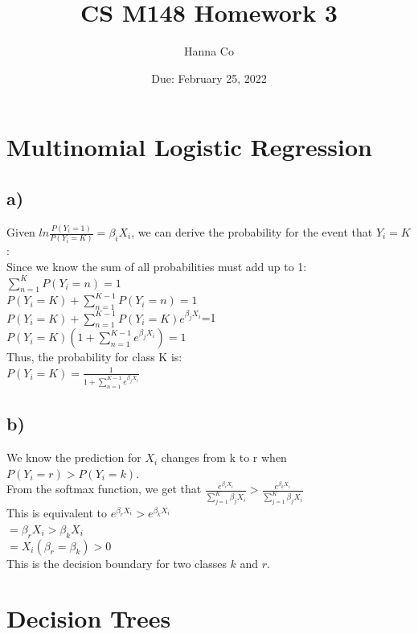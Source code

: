 \documentclass[12pt, letterpaper]{article}
\title{CS M148 Homework 3}
\author{Hanna Co}
\date{Due: February 25, 2022}
\begin{document}
\maketitle
\newpage
\section{Multinomial Logistic Regression}
\subsection*{a)} Given $ln\frac{P(Y_i=1)}{P(Y_i=K)} = \beta_iX_i$, we can derive the probability for the event that $Y_i=K$:\\
Since we know the sum of all probabilities must add up to 1:\\
$\sum_{n=1}^{K}P(Y_i=n)=1$\\
$P(Y_i=K)+\sum_{n=1}^{K-1}P(Y_i=n)=1$\\
$P(Y_i=K)+\sum_{n=1}^{K-1}P(Y_i=K)e^{\beta_jX_i}$=1\\
$P(Y_i=K)(1+\sum_{n=1}^{K-1}e^{\beta_jX_i})=1$\\
Thus, the probability for class K is:\\
$P(Y_i=K)=\frac{1}{1+\sum_{n=1}^{K-1}e^{\beta_jX_i}}$\\

\subsection*{b)} We know the prediction for $X_i$ changes from k to r when $P(Y_i=r)>P(Y_i=k)$.\\
From the softmax function, we get that $\frac{e^{\beta_rX_i}}{\sum_{j=1}^{K}\beta_jX_i}>\frac{e^{\beta_kX_i}}{\sum_{j=1}^{K}\beta_jX_i}$\\
This is equivalent to $e^{\beta_rX_i}>e^{\beta_kX_i}$\\
$= \beta_rX_i>\beta_kX_i$\\
$= X_i(\beta_r=\beta_k)>0$\\
This is the decision boundary for two classes $k$ and $r$.

\newpage
\section{Decision Trees}
\end{document}

